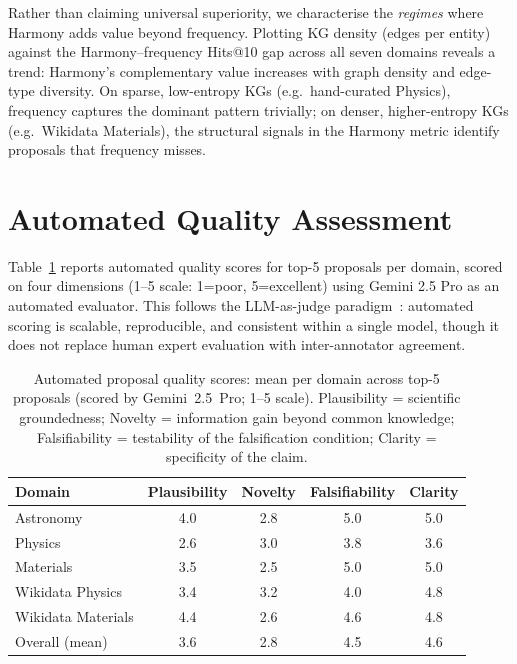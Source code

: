 Rather than claiming universal superiority, we characterise the \emph{regimes}
where Harmony adds value beyond frequency.  Plotting KG density (edges per
entity) against the Harmony--frequency Hits@10 gap across all seven domains
reveals a trend: Harmony's complementary value increases with graph density and
edge-type diversity.  On sparse, low-entropy KGs (e.g.\ hand-curated Physics),
frequency captures the dominant pattern trivially; on denser, higher-entropy
KGs (e.g.\ Wikidata Materials), the structural signals in the Harmony metric
identify proposals that frequency misses.

\section{Automated Quality Assessment}\label{app:rubric-results}

Table~\ref{tab:rubric} reports automated quality scores for top-5 proposals per
domain, scored on four dimensions (1--5 scale: 1=poor, 5=excellent) using
Gemini 2.5 Pro as an automated evaluator.  This follows the LLM-as-judge
paradigm~\citep{zheng2023judging}: automated scoring is scalable, reproducible,
and consistent within a single model, though it does not replace human expert
evaluation with inter-annotator agreement.

\begin{table}[t]
\centering
\caption{Automated proposal quality scores: mean per domain across top-5
proposals (scored by Gemini~2.5~Pro; 1--5 scale).  Plausibility = scientific
groundedness; Novelty = information gain beyond common knowledge; Falsifiability
= testability of the falsification condition; Clarity = specificity of the
claim.}\label{tab:rubric}
\small
\begin{tabular}{lcccc}
\toprule
Domain & Plausibility & Novelty & Falsifiability & Clarity \\
\midrule
Astronomy         & 4.0 & 2.8 & 5.0 & 5.0 \\
Physics           & 2.6 & 3.0 & 3.8 & 3.6 \\
Materials         & 3.5 & 2.5 & 5.0 & 5.0 \\
Wikidata Physics  & 3.4 & 3.2 & 4.0 & 4.8 \\
Wikidata Materials & 4.4 & 2.6 & 4.6 & 4.8 \\
\midrule
Overall (mean)    & 3.6 & 2.8 & 4.5 & 4.6 \\
\bottomrule
\end{tabular}
\end{table}

